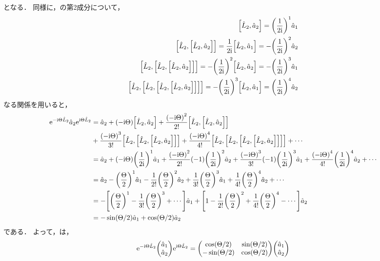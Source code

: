 \documentclass{report}
\begin{document}
    となる．
    同様に，の第2成分について，
    \begin{align}
      \qty[\hat{L}_2, \hat{a}_2] = \qty(\frac{1}{2\mathrm{i}})^1\hat{a}_1 \\ 
      \qty[\hat{L}_2, \qty[\hat{L}_2, \hat{a}_2]] = \frac{1}{2\mathrm{i}}\qty[\hat{L}_2, \hat{a}_1] = -\qty(\frac{1}{2\mathrm{i}})^2\hat{a}_2 \\ 
      \qty[\hat{L}_2, \qty[\hat{L}_2, \qty[\hat{L}_2, \hat{a}_2]]] = -\qty(\frac{1}{2\mathrm{i}})^2\qty[\hat{L}_2, \hat{a}_2] = -\qty(\frac{1}{2\mathrm{i}})^3\hat{a}_1 \\ 
      \qty[\hat{L}_2, \qty[\hat{L}_2, \qty[\hat{L}_2, \qty[\hat{L}_2, \hat{a}_2]]]] = -\qty(\frac{1}{2\mathrm{i}})^3\qty[\hat{L}_2, \hat{a}_1] = \qty(\frac{1}{2\mathrm{i}})^4\hat{a}_2
    \end{align}
    なる関係を用いると，
    \begin{align}
      \mathrm{e}^{-\mathrm{i}\Theta\hat{L}_2}\hat{a}_2\mathrm{e}^{\mathrm{i}\Theta\hat{L}_2} &= \hat{a}_2 + \qty(-\mathrm{i}\Theta)\qty[\hat{L}_2, \hat{a}_2] + \frac{\qty(-\mathrm{i}\Theta)^2}{2!}\qty[\hat{L}_2, \qty[\hat{L}_2, \hat{a}_2]]\notag \\ 
      &+ \frac{\qty(-\mathrm{i}\Theta)^3}{3!}\qty[\hat{L}_2, \qty[\hat{L}_2, \qty[\hat{L}_2, \hat{a}_2]]] + \frac{\qty(-\mathrm{i}\Theta)^4}{4!}\qty[\hat{L}_2, \qty[\hat{L}_2, \qty[\hat{L}_2, \qty[\hat{L}_2, \hat{a}_2]]]] + \cdots \\ 
      &= \hat{a}_2 + \qty(-\mathrm{i}\Theta)\qty(\frac{1}{2\mathrm{i}})^1\hat{a}_1 + \frac{\qty(-\mathrm{i}\Theta)^2}{2!}\qty(-1)\qty(\frac{1}{2\mathrm{i}})^2\hat{a}_2 + \frac{\qty(-\mathrm{i}\Theta)^3}{3!}\qty(-1)\qty(\frac{1}{2\mathrm{i}})^3\hat{a}_1 + \frac{\qty(-\mathrm{i}\Theta)^4}{4!}\qty(\frac{1}{2\mathrm{i}})^4\hat{a}_2 + \cdots \\ 
      &= \hat{a}_2 - \qty(\frac{\Theta}{2})^1\hat{a}_1 - \frac{1}{2!}\qty(\frac{\Theta}{2})^2\hat{a}_2 + \frac{1}{3!}\qty(\frac{\Theta}{2})^3\hat{a}_1 + \frac{1}{4!}\qty(\frac{\Theta}{2})^4\hat{a}_2 + \cdots \\ 
      &= -\qty[\qty(\frac{\Theta}{2})^1 - \frac{1}{3!}\qty(\frac{\Theta}{2})^3 + \cdots]\hat{a}_1 + \qty[1 - \frac{1}{2!}\qty(\frac{\Theta}{2})^2 + \frac{1}{4!}\qty(\frac{\Theta}{2})^4 - \cdots]\hat{a}_2 \\ 
      &= -\sin(\Theta / 2)\hat{a}_1 + \cos(\Theta / 2)\hat{a}_2
    \end{align}
    である．
    よって，は，
    \begin{align}
      \e^{-\i\Theta\hat{L}_2}\mqty(\hat{a}_1 \\ \hat{a}_2)\e^{\i\Theta\hat{L}_2} = \mqty(
        \cos(\Theta / 2) & \sin(\Theta / 2) \\ 
        -\sin(\Theta / 2) & \cos(\Theta / 2)
      )\mqty(\hat{a}_1 \\ \hat{a}_2)\label{beam-splitter-hamiltonian-prep}
    \end{align}
\end{document}
